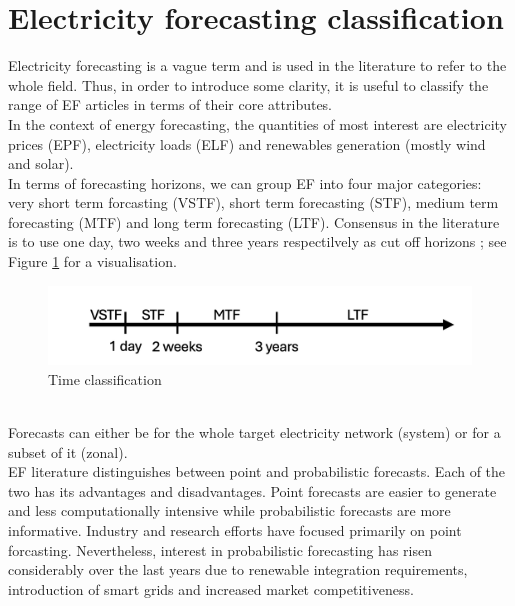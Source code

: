 \section{Electricity forecasting classification}
Electricity forecasting is a vague term and is used in the literature to refer to the whole field. Thus, in order to introduce some clarity, it is useful to classify the range of EF articles in terms of their core attributes.
\\
In the context of energy forecasting, the quantities of most interest are electricity prices (EPF), electricity loads (ELF) and renewables generation (mostly wind and solar).
\\
In terms of forecasting horizons, we can group EF into four major categories: very short term forcasting (VSTF), short term forecasting (STF), medium term forecasting (MTF) and long term forecasting (LTF). Consensus in the literature is to use one day, two weeks and three years respectilvely as cut off horizons \cite{hong_phd}; see Figure \ref{fig:time} for a visualisation. 
\begin{figure}
  \includegraphics[width=\textwidth]{images/time_2.png}
  \caption{Time classification \cite{prob_elf}}
  \label{fig:time}
\end{figure}
\\
Forecasts can either be for the whole target electricity network (system) or for a subset of it (zonal).
\\
EF literature distinguishes between point and probabilistic forecasts. Each of the two has its advantages and disadvantages. Point forecasts are easier to generate and less computationally intensive while probabilistic forecasts are more informative. Industry and research efforts have focused primarily on point forcasting. Nevertheless, interest in probabilistic forecasting has risen considerably over the last years due to renewable integration requirements, introduction of smart grids and increased market competitiveness.
